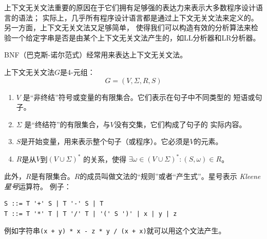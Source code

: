 上下文无关文法重要的原因在于它们拥有足够强的表达力来表示大多数程序设计语言的语法；
实际上，几乎所有程序设计语言都是通过上下文无关文法来定义的。
另一方面，上下文无关文法又足够简单，
使得我们可以构造有效的分析算法来检验一个给定字串是否是由某个上下文无关文法产生的，如LL分析器和LR分析器。

BNF（巴克斯-诺尔范式）经常用来表达上下文无关文法。 

上下文无关文法$G$是4-元组：
\begin{equation*}
        G = (V, \Sigma, R, S)
\end{equation*}
\begin{enumerate}
        \item $V$ 是``非终结''符号或变量的有限集合。它们表示在句子中不同类型的
                短语或句子。
        \item $\Sigma$ 是``终结符''的有限集合，与$V$没有交集，它们构成了句子的
                实际内容。
        \item $S$是开始变量，用来表示整个句子（或程序）。它必须是$V$的元素。
        \item $R$是从$V$到$(V\cup\Sigma)^{*}$ 的关系，使得
                $ \exists \omega \in (V\cup\Sigma)^{*}: (S,\omega) \in R$。
\end{enumerate}
此外，$R$是有限集合。$R$的成员叫做文法的``规则''或者``产生式''。星号表示
\emph{Kleene星号}运算符。
例子：
\begin{lstlisting}
S ::= T '+' S | T '-' S | T
T ::= T '*' T | T '/' T | '(' S ')' | x | y | z
\end{lstlisting}
例如字符串\texttt{(x + y) * x - z * y / (x + x)}就可以用这个文法产生。
